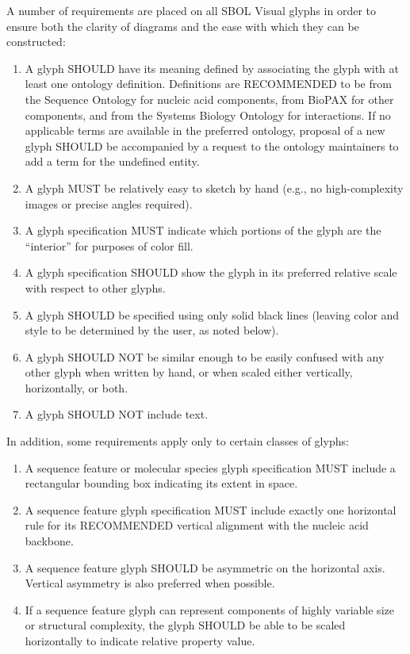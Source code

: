 A number of requirements are placed on all SBOL Visual glyphs in order to
ensure both the clarity of diagrams and the ease with which they can
be constructed:
\begin{enumerate}
\item A glyph SHOULD have its meaning defined by associating the glyph with at least one ontology definition.
	Definitions are RECOMMENDED to be from the Sequence Ontology for nucleic acid components, from BioPAX for other components, and from the Systems Biology Ontology for interactions.  
	If no applicable terms are available in the preferred ontology, proposal of a new glyph SHOULD be accompanied by a request to the ontology maintainers to add a term for the undefined entity.  
\item A glyph MUST be relatively easy to sketch by hand (e.g., no high-complexity images or precise angles required).
\item A glyph specification MUST indicate which portions of the glyph are the ``interior'' for purposes of color fill.
\item A glyph specification SHOULD show the glyph in its preferred relative scale with respect to other glyphs.
\item A glyph SHOULD be specified using only solid black lines (leaving color and style to be determined by the user, as noted below).
\item A glyph SHOULD NOT be similar enough to be easily confused with any other glyph when written by hand, or when scaled either vertically, horizontally, or both.
\item A glyph SHOULD NOT include text.
\end{enumerate}

In addition, some requirements apply only to certain classes of glyphs:
\begin{enumerate}[resume]
\item A sequence feature or molecular species glyph specification MUST include a rectangular bounding box indicating its extent in space.
\item A sequence feature glyph specification MUST include exactly one horizontal rule for its RECOMMENDED vertical alignment with the nucleic acid backbone.
\item A sequence feature glyph SHOULD be asymmetric on the horizontal axis. Vertical asymmetry is also preferred when possible.
\item If a sequence feature glyph can represent components of highly variable size or structural complexity, the glyph SHOULD be able to be scaled horizontally to indicate relative property value.
\end{enumerate}

